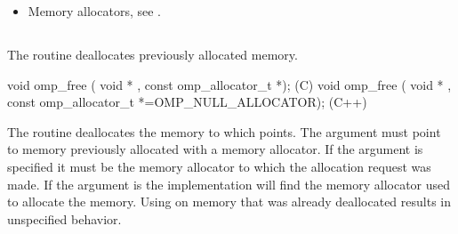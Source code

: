 \crossreferences
\begin{itemize}
\item Memory allocators, see .
\end{itemize}

\subsection{}
\label{subsec:omp_free}

\summary
The  routine deallocates previously allocated memory. 

\format

\begin{boxedcode}
void omp_free ( void * , const omp\_allocator\_t *);        (C)
void omp_free ( void * , 
             const omp\_allocator\_t *=OMP_NULL_ALLOCATOR); (C++)
\end{boxedcode}

\effect

The  routine deallocates the memory to which  points. The  argument must point to memory previously allocated with a memory allocator. If the  argument is specified it must be the memory allocator to which the allocation request was made. If the  argument is  the implementation will find the memory allocator used to allocate the memory. Using  on memory that was already deallocated results in unspecified behavior.

\ccppspecificend

